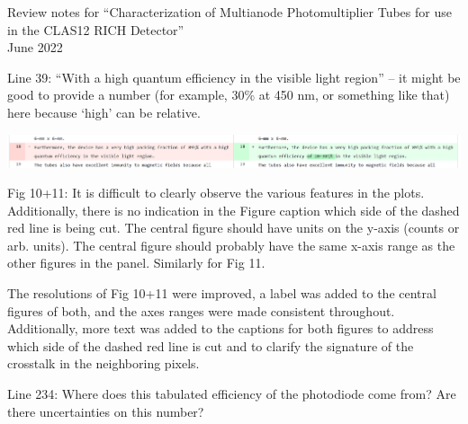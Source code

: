 \documentclass[11pt]{report}
\begin{document}
 

{\LARGE\centering
Review notes for “Characterization of Multianode Photomultiplier Tubes for use in the CLAS12 RICH Detector”\\[1cm]

June 2022\\[1cm]
}

\begin{tcolorbox}[enlarge top by=2em,colbacktitle=black!60!white,colframe=black!80!white,left=0pt,right=0pt,top=0pt,bottom=0pt,boxrule=0.3pt,title=\bfseries1.01]
Line 39: “With a high quantum efficiency in the visible light region” – it might be good to provide a number (for example, 30\% at 450 nm, or something like that) here because ‘high’ can be relative.
\end{tcolorbox}


\includegraphics[width=\linewidth]{round1/1.01.png}

\begin{tcolorbox}[enlarge top by=2em,colbacktitle=red!60!white,colframe=black!80!white,left=0pt,right=0pt,top=0pt,bottom=0pt,boxrule=0.3pt,title=\bfseries1.02]
Fig  10+11:  It  is  difficult  to  clearly  observe  the  various  features  in  the  plots.   Additionally,  there  is no indication in the Figure caption which side of the dashed red line is being cut.  The central figure should have units on the y-axis (counts or arb.  units).  The central figure should probably have the same x-axis range as the other figures in the panel.  Similarly for Fig 11.
\end{tcolorbox}

The resolutions of Fig 10+11 were improved, a label was added to the central figures of both, and the axes ranges were made consistent throughout. Additionally, more text was added to the captions for both figures to address which side of the dashed red line is cut and to clarify the signature of the crosstalk in the neighboring pixels.

\begin{tcolorbox}[enlarge top by=2em,colbacktitle=black!60!white,colframe=black!80!white,left=0pt,right=0pt,top=0pt,bottom=0pt,boxrule=0.3pt,title=\bfseries1.03]
Line 234:  Where does this tabulated efficiency of the photodiode come from?  Are there uncertainties on this number?
\end{tcolorbox}
\end{document}
